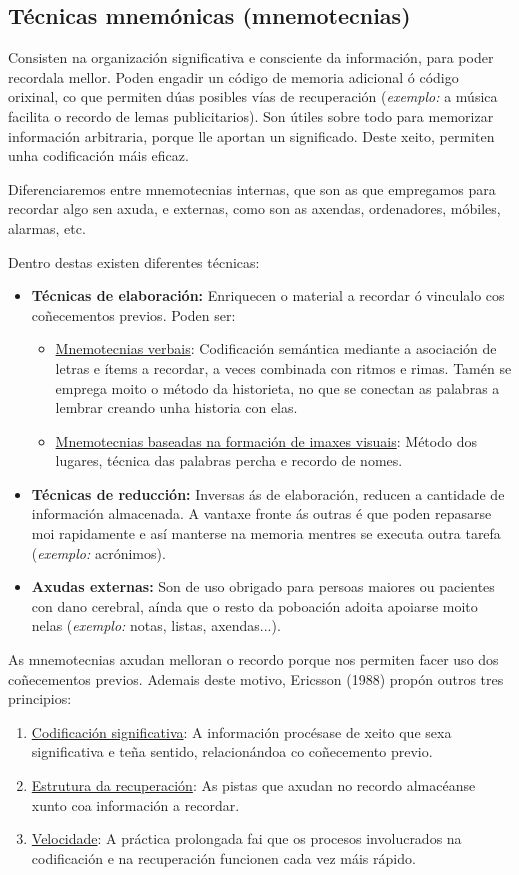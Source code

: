 \documentclass[a4paper,11pt]{article}
\begin{document}
\subsection{Técnicas mnemónicas (mnemotecnias)}
Consisten na organización significativa e consciente da información, para poder recordala mellor. Poden engadir un código de memoria adicional ó código orixinal, co que permiten dúas posibles vías de recuperación (\textit{exemplo:} a música facilita o recordo de lemas publicitarios). Son útiles sobre todo para memorizar información arbitraria, porque lle aportan un significado. Deste xeito, permiten unha codificación máis eficaz.

Diferenciaremos entre mnemotecnias internas, que son as que empregamos para recordar algo sen axuda, e externas, como son as axendas, ordenadores, móbiles, alarmas, etc.

Dentro destas existen diferentes técnicas:
\begin{itemize}
	\item \textbf{Técnicas de elaboración:} Enriquecen o material a recordar ó vinculalo cos
	coñecementos previos. Poden ser:
	\begin{itemize}
		\item \underline{Mnemotecnias verbais}: Codificación semántica mediante a asociación de 				letras e ítems a recordar, a veces combinada con ritmos e rimas. Tamén se emprega moito o
		método da historieta, no que se conectan as palabras a lembrar creando unha historia con
		elas.
		\item \underline{Mnemotecnias baseadas na formación de imaxes visuais}: Método dos lugares, 			técnica das palabras percha e recordo de nomes.
	\end{itemize}
	\item \textbf{Técnicas de reducción:} Inversas ás de elaboración, reducen a cantidade de
	información almacenada. A vantaxe fronte ás outras é que poden repasarse moi rapidamente e así
	manterse na memoria mentres se executa outra tarefa (\textit{exemplo:} acrónimos).
	\item \textbf{Axudas externas:} Son de uso obrigado para persoas maiores ou pacientes con dano
	cerebral, aínda que o resto da poboación adoita apoiarse moito nelas (\textit{exemplo:} notas,
	listas, axendas...). 
\end{itemize}

As mnemotecnias axudan melloran o recordo porque nos permiten facer uso dos coñecementos previos. Ademais deste motivo, Ericsson (1988) propón outros tres principios:
\begin{enumerate}
	\item \underline{Codificación significativa}: A información procésase de xeito que sexa
	significativa e teña sentido, relacionándoa co coñecemento previo.
	\item \underline{Estrutura da recuperación}: As pistas que axudan no recordo almacéanse xunto coa
	información a recordar.
	\item \underline{Velocidade}: A práctica prolongada fai que os procesos involucrados na
	codificación e na recuperación funcionen cada vez máis rápido. 
\end{enumerate}
\end{document}
